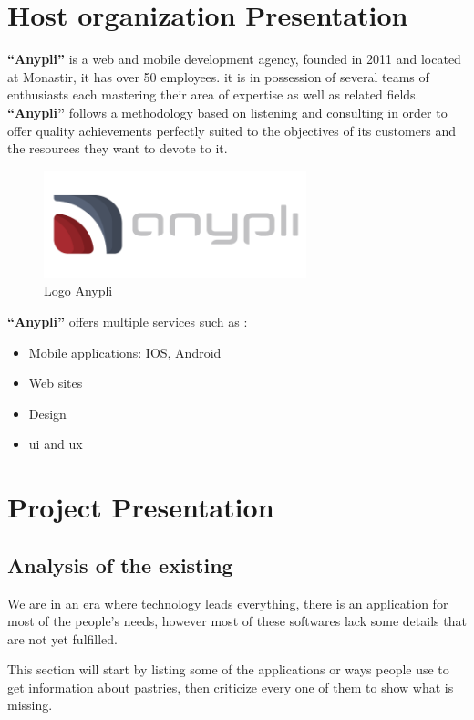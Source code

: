 \documentclass[12pt,a4paper]{report}
\begin{document}
	\section{Host organization Presentation}
	\textbf{``Anypli''} is a web and mobile development agency, founded in 2011 and located at Monastir, it has over 50 employees. it is in possession of several teams of enthusiasts each mastering their area of expertise as well as related fields. \textbf{``Anypli''} follows a methodology based on listening and consulting in order to offer quality achievements perfectly suited to the objectives of its customers and the resources they want to devote to it. \par
	\begin{figure}[H]
		\centering
		\includegraphics[width=3in,keepaspectratio]{logo_anypli.png}
		\caption{Logo Anypli}
		
	\end{figure}
	\textbf{``Anypli''} offers multiple services such as :
	\begin{itemize}
		\item Mobile applications: IOS, Android
		\item Web sites
		\item Design
		\item \ac{ui} and \ac{ux}
		
	\end{itemize}
	\section{Project Presentation}	
	
	\subsection{Analysis of the existing}
	We are in an era where technology leads everything, there is an application for most of the people's needs, however most of these softwares lack some details that are not yet fulfilled.\par
	This section will start by listing some of the applications or ways people use to get information about pastries, then criticize every one of them to show what is missing.
	
\end{document}
